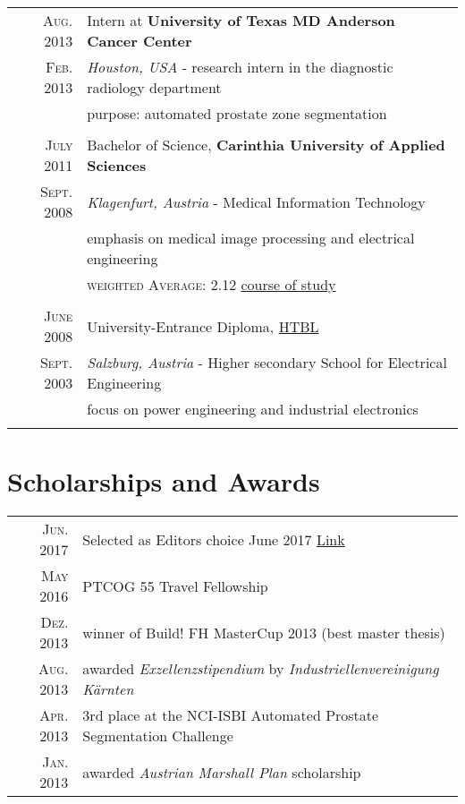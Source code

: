 \documentclass[a4paper,10pt]{article}
\begin{document}
\begin{tabular}{rl}
\textsc{Aug.} 2013 & Intern at \textbf{University of Texas MD Anderson Cancer Center}\\
\textsc{Feb.} 2013 &\emph{Houston, USA} - research intern in the diagnostic radiology department\\
& purpose: automated prostate zone segmentation\\
&\\

\textsc{July} 2011 & Bachelor of Science, \textbf{Carinthia University of Applied Sciences}\\
\textsc{Sept.} 2008 &\emph{Klagenfurt, Austria} - Medical Information Technology\\
& emphasis on medical image processing and electrical engineering\\
&\normalsize \textsc{weighted Average}: 2.12 \hspace{10mm}  \href{https://www.fh-kaernten.at/unser-studienangebot/engineering-it/ueberblick/engineering-it/bachelor/informationstechnologien/studiengaenge-informationstechnologien/medizintechnik/}{course of study}\\
&\\


\textsc{June} 2008 & University-Entrance Diploma, \href{http://www.htl-salzburg.ac.at/elektrotechnik.html}{HTBL}\\
\textsc{Sept.} 2003 &\emph{Salzburg, Austria} - Higher secondary School for Electrical Engineering \\
& focus on power engineering and industrial electronics \\

&\\

\end{tabular}

\pagebreak

\section{Scholarships and Awards}

\begin{tabular}{rl}
\textsc{Jun.} 2017 & Selected as Editors choice June 2017 \href{http://onlinelibrary.wiley.com/doi/10.1002/mp.12251/full}{Link}\\
\textsc{May} 2016 & PTCOG 55 Travel Fellowship\\
\textsc{Dez.} 2013 & winner of Build! FH MasterCup 2013 (best master thesis)\\
\textsc{Aug.} 2013 & awarded \emph{Exzellenzstipendium} by \emph{Industriellenvereinigung K{\"a}rnten}\\ %
\textsc{Apr.} 2013 & 3rd place at the NCI-ISBI Automated Prostate Segmentation Challenge\\
\textsc{Jan.} 2013 & awarded \emph{Austrian Marshall Plan} scholarship\\ %
\end{tabular}
\end{document}
